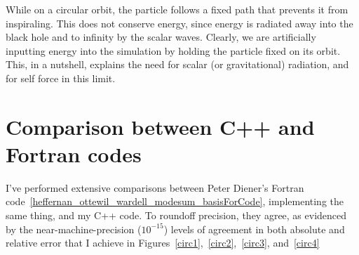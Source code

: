 While on a circular orbit, the particle follows a fixed path that prevents it from inspiraling. This does not conserve energy, since energy is radiated away into the black hole and to infinity by the scalar waves. Clearly, we are artificially inputting energy into the simulation by holding the particle fixed on its orbit. This, in a nutshell, explains the need for scalar (or gravitational) radiation, and for self force in this limit. 


\section{Comparison between C++ and Fortran codes}

I've performed extensive comparisons between Peter Diener's Fortran code~\ref{heffernan_ottewil_wardell_modesum_basisForCode}, implementing the same thing, and my C++ code. To roundoff precision, they agree, as evidenced by the near-machine-precision ($10^{-15}$) levels of agreement in both absolute and relative error that I achieve in Figures~\ref{circ1},~\ref{circ2},~\ref{circ3}, and~\ref{circ4}

